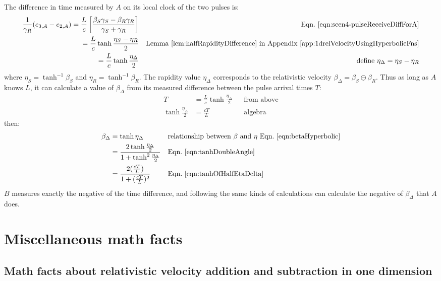 \documentclass[a4paper]{article}
\theoremstyle{plain}
\theoremstyle{definition}
\begin{document}
The difference in time measured by $A$ on its local clock of the two
pulses is:
\begin{align*}
\frac{1}{\gamma_R} (e_{3,A}-e_{2,A})
  = \frac{L}{c} \left[ \frac{\beta_S\gamma_S - \beta_R\gamma_R}{\gamma_S + \gamma_R} \right] & & \text{Eqn.~\eqref{eqn:scen4-pulseReceiveDiffForA}} \\
  = \frac{L}{c} \tanh \frac{\eta_S-\eta_R}{2} & & \text{Lemma~\ref{lem:halfRapidityDifference} in Appendix~\ref{app:1drelVelocityUsingHyperbolicFns}} \\
  = \frac{L}{c} \tanh \frac{\eta_{\Delta}}{2} & & \text{define $\eta_{\Delta}=\eta_S-\eta_R$}
\end{align*}
where $\eta_S = \tanh^{-1} \beta_S$ and $\eta_R = \tanh^{-1} \beta_R$.
The rapidity value $\eta_{\Delta}$ corresponds to the relativistic
velocity $\beta_{\Delta} = \beta_S \ominus \beta_R$.  Thus as long as
$A$ knows $L$, it can calculate a value of $\beta_{\Delta}$ from
its measured difference between the pulse arrival times $T$:
\begin{align}
T & = \frac{L}{c} \tanh \frac{\eta_{\Delta}}{2} & & \text{from above} \nonumber \\
\tanh \frac{\eta_{\Delta}}{2} & = \frac{cT}{L} & & \text{algebra} \label{eqn:tanhOfHalfEtaDelta}
\end{align}
then:
\begin{align*}
\beta_{\Delta}
  & = \tanh \eta_{\Delta} & & \text{relationship between $\beta$ and $\eta$ Eqn.~\eqref{eqn:betaHyperbolic}} \\
  & = \frac{2\tanh \frac{\eta_{\Delta}}{2}}{1+\tanh^2 \frac{\eta_{\Delta}}{2}} & & \text{Eqn.~\eqref{eqn:tanhDoubleAngle}} \\
  & = \frac{2 (\frac{cT}{L})}{1+(\frac{cT}{L})^2} & & \text{Eqn.~\eqref{eqn:tanhOfHalfEtaDelta}} \\
\end{align*}
$B$ measures exactly the negative of the time difference, and
following the same kinds of calculations can calculate the negative of
$\beta_{\Delta}$ that $A$ does.




\appendix

\section{Miscellaneous math facts}

\subsection{Math facts about relativistic velocity addition and subtraction in one dimension}
\label{app:1drelvelocityadd}
\end{document}
